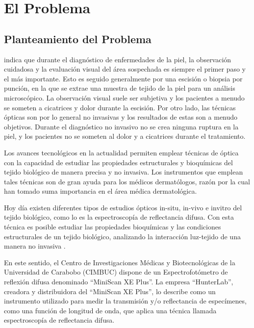 \chapter{\label{cap:1}El Problema}

	\section{Planteamiento del Problema}	
\cite{Bersha} indica que durante el diagn\'{o}stico de enfermedades de la piel, la observaci\'{o}n cuidadosa y la evaluaci\'{o}n visual del \'{a}rea sospechada es siempre el primer paso y el m\'{a}s importante. Esto es seguido generalmente por una escisi\'{o}n o biopsia por punci\'{o}n, en la que se extrae una muestra de tejido de la piel para un an\'{a}lisis microsc\'{o}pico. La observaci\'{o}n visual suele ser subjetiva y los pacientes a menudo se someten a cicatrices y dolor durante la escisi\'{o}n. Por otro lado, las t\'{e}cnicas \'{o}pticas son por lo general no invasivas y los resultados de estas son a menudo objetivos. Durante el diagn\'{o}stico no invasivo no se crea ninguna ruptura en la piel, y los pacientes no se someten al dolor y a cicatrices durante el tratamiento.

Los avances tecnol\'{o}gicos en la actualidad permiten emplear t\'{e}cnicas de \'{o}ptica con la capacidad de estudiar  las propiedades estructurales y bioqu\'{i}micas del tejido biol\'{o}gico de manera precisa y no invasiva. Los instrumentos que emplean tales t\'{e}cnicas son de gran ayuda para los m\'{e}dicos dermat\'{o}logos, raz\'{o}n por la cual han tomado suma importancia en el \'{a}rea m\'{e}dica dermatol\'{o}gica.

Hoy d\'{i}a existen diferentes tipos de estudios \'{o}pticos in-situ, in-vivo e invitro del tejido biol\'{o}gico, como lo es la espectroscop\'{i}a de reflectancia difusa. Con esta t\'{e}cnica es  posible estudiar las propiedades bioqu\'{i}micas y las condiciones estructurales de un tejido biol\'{o}gico, analizando la interacci\'{o}n luz-tejido de una manera no invasiva \cite{Perez-Gallardo}.

En este sentido, el Centro de Investigaciones M\'{e}dicas y Biotecnol\'{o}gicas de la Universidad de Carabobo (CIMBUC) dispone de un Espectrofot\'{o}metro de reflexi\'{o}n difusa denominado ``MiniScan XE Plus''. La empresa ``HunterLab'', creadora y distribuidora del ``MiniScan XE Plus'', lo describe como un instrumento utilizado para medir la transmisi\'{o}n y/o reflectancia de espec\'{i}menes, como una funci\'{o}n de longitud de onda, que aplica una t\'{e}cnica llamada espectroscop\'{i}a de reflectancia difusa. 

